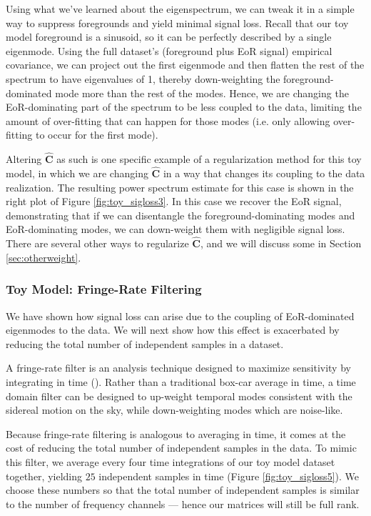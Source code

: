 \documentclass[preprint2,numberedappendix,tighten]{aastex6}
\newcommand{\cc}[1]{{\color{purple} \textbf{[CC: #1]}}}
\begin{document}
Using what we've learned about the eigenspectrum, we can tweak it in a simple way to suppress foregrounds and yield minimal 
signal loss. Recall that our toy model foreground is a sinusoid, so it can be perfectly described by a single eigenmode. Using the full dataset's (foreground plus EoR signal) empirical covariance, we can 
project out the first eigenmode and then flatten the rest of the spectrum to have eigenvalues of 1, thereby down-weighting the foreground-dominated mode more than the rest of the modes. Hence, we are changing the EoR-dominating part of the spectrum to be less coupled to the data, limiting the amount of over-fitting that can happen for those modes (i.e. only allowing over-fitting to occur for the first mode).

Altering $\widehat{\textbf{C}}$ as such is one specific example of a regularization method for this toy model, in which we are 
changing $\widehat{\textbf{C}}$ in a way that changes its coupling to the data realization. The resulting 
power spectrum estimate for this case is shown in the right plot of Figure \ref{fig:toy_sigloss3}. In this case we recover the EoR signal, 
demonstrating that if we can disentangle the foreground-dominating modes and EoR-dominating modes, we can down-weight 
them with negligible signal loss. There are several other ways to regularize $\widehat{\textbf{C}}$, and we will discuss some in Section 
\ref{sec:otherweight}.

\subsubsection{Toy Model: Fringe-Rate Filtering}
\label{sec:toymodel_frf}

We have shown how signal loss can arise due to the coupling of EoR-dominated eigenmodes to the data. We will next show how this effect is exacerbated by reducing the total number of independent 
samples in a dataset. 

A fringe-rate filter is an analysis technique designed to maximize sensitivity by integrating in time (\citealt{parsons_et_al2016}). 
Rather than a traditional box-car average in time, a time domain filter can be designed to up-weight temporal modes consistent with 
the sidereal motion on the sky, while down-weighting modes which are noise-like. 

Because fringe-rate filtering is analogous to averaging in time, it comes at the cost of reducing the total number of independent 
samples in the data. To mimic this filter, we average every four time integrations of our toy model dataset together, yielding 
$25$ independent samples in time (Figure \ref{fig:toy_sigloss5}). We choose these numbers so that the total number of 
independent samples is similar to the number of frequency channels --- hence our matrices will still be full rank.
\end{document}
